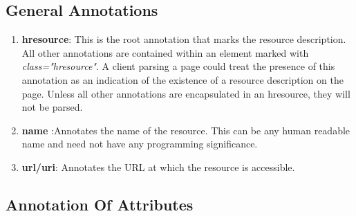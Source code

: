 \documentclass[journal]{IEEEtran}
\begin{document}
\subsection{General Annotations}
\begin{enumerate}

\item {\bf hresource}: This is the root annotation that marks the resource description. All other annotations are contained within an element marked with {\it class="hresource"}. A client parsing a page could treat the presence of this annotation as an indication of the existence of a resource description on the page. Unless all other annotations are encapsulated in an hresource, they will not be parsed.

\item {\bf name} :Annotates the name of the resource. This can be any human readable name and need not have any programming significance.

\item {\bf url/uri}: Annotates the URL at which the resource is accessible.
\end{enumerate}

\subsection{Annotation Of Attributes}
\end{document}
